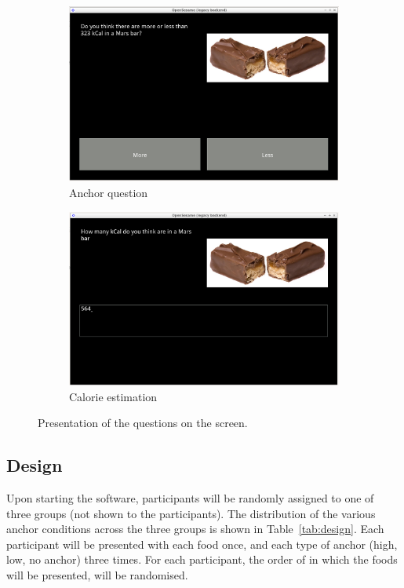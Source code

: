 \documentclass[a4paper,doc,natbib]{apa6}
\begin{document}
\begin{figure}[h!]
\begin{subfigure}[b]{0.49\textwidth}
 \caption{Anchor question}
\includegraphics[width=0.95\linewidth]{Images/anchor_question.png}
 \end{subfigure}
 \begin{subfigure}[b]{0.49\textwidth}
 \caption{Calorie estimation}
\includegraphics[width=0.95\linewidth]{Images/guess_question.png}
 \end{subfigure}
 \caption{Presentation of the questions on the screen.}
\label{fig:screenshots}
\end{figure}

\subsection{Design}

Upon starting the software, participants will be randomly assigned to one of three groups (not shown to the participants). The distribution of the various anchor conditions across the three groups is shown in Table~\ref{tab:design}. Each participant will be presented with each food once, and each type of anchor (high, low, no anchor) three times. For each participant, the order of in which the foods will be presented, will be randomised.
\end{document}
